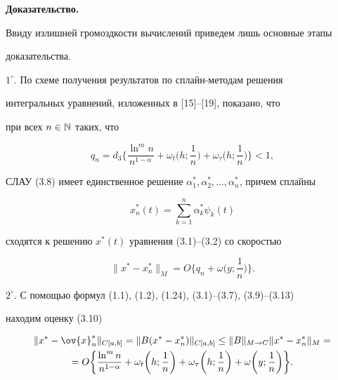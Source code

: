 {\bf Доказательство.}


Ввиду излишней громоздкости вычислений приведем лишь основные этапы


доказательства.





$1^\circ $. По схеме получения результатов по сплайн-методам решения


интегральных уравнений, изложенных в [15]--[19], показано, что


при всех $n\in \Bbb N$ таких, что


\begin{equation}


q_n=d_3\bigg\{ \frac{\ln^mn}{n^{1-\alpha}}+\omega_t\bigg(h;\frac{1}{n}\bigg)


+\omega_\tau\bigg(h;\frac{1}{n}\bigg) \bigg\} <1,


\end{equation}


СЛАУ (3.8) имеет единственное решение $\alpha_1^*,\alpha_2^*,\dotsc


,\alpha_n^*$, причем сплайны


\begin{equation}


x_n^*(t)=\sum_{k=1}^n\alpha_k^*\psi_k(t)


\end{equation}


сходятся к решению $x^*(t)$ уравнения (3.1)--(3.2) со скоростью


\begin{equation}


\|x^*-x_n^*\|_M=O\bigg\{ q_n+\omega\bigg(y;\frac{1}{n}\bigg)\bigg\} .


\end{equation}





$2^\circ$. С помощью формул (1.1), (1.2), (1.24), (3.1)--(3.7), (3.9)--(3.13)


находим оценку (3.10)


\begin{multline*}


\|x^*-\ov{x}_n^*\|_{C[a,b]}=\|B(x^*-x^*_n)\|_{C[a,b]}\leq


\|B\|_{M\rightarrow C} \|x^*-x_n^*\|_M=\\


%


=O\bigg\{\frac{\ln ^mn}{n^{1-\alpha}}+ \omega_t\bigg(h;\frac{1}{n}\bigg)


+\omega_\tau\bigg(h;\frac{1}{n}\bigg)+\omega\bigg(y;\frac{1}{n}\bigg)\bigg\}.


\end{multline*}





